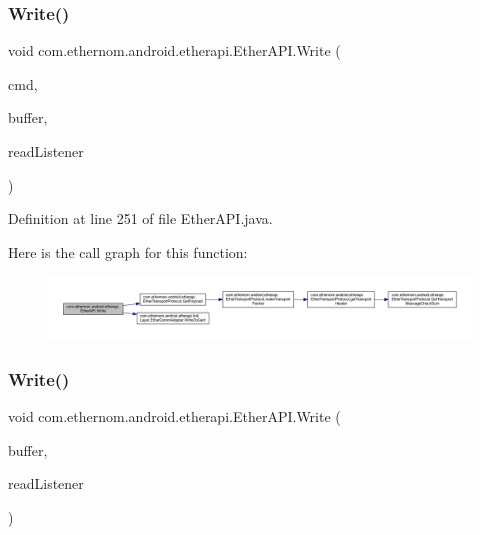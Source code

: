 \subsubsection{\texorpdfstring{Write()}{Write()}\hspace{0.1cm}{\footnotesize\ttfamily [5/6]}}
{\footnotesize\ttfamily void com.\+ethernom.\+android.\+etherapi.\+Ether\+A\+P\+I.\+Write (\begin{DoxyParamCaption}\item[{byte}]{cmd,  }\item[{String}]{buffer,  }\item[{final \mbox{\hyperlink{interfacecom_1_1ethernom_1_1android_1_1etherapi_1_1_read_listener}{Read\+Listener}}}]{read\+Listener }\end{DoxyParamCaption})}



Definition at line 251 of file Ether\+A\+P\+I.\+java.

Here is the call graph for this function\+:\nopagebreak
\begin{figure}[H]
\begin{center}
\leavevmode
\includegraphics[width=350pt]{classcom_1_1ethernom_1_1android_1_1etherapi_1_1_ether_a_p_i_a397b87cd1ab2b0d151289e39b8b2f16c_cgraph}
\end{center}
\end{figure}
\mbox{\label{classcom_1_1ethernom_1_1android_1_1etherapi_1_1_ether_a_p_i_a11ed9e46f15a79e2221577a7b1cd68ab}} 
\subsubsection{\texorpdfstring{Write()}{Write()}\hspace{0.1cm}{\footnotesize\ttfamily [6/6]}}
{\footnotesize\ttfamily void com.\+ethernom.\+android.\+etherapi.\+Ether\+A\+P\+I.\+Write (\begin{DoxyParamCaption}\item[{String}]{buffer,  }\item[{final \mbox{\hyperlink{interfacecom_1_1ethernom_1_1android_1_1etherapi_1_1_read_listener}{Read\+Listener}}}]{read\+Listener }\end{DoxyParamCaption})}



